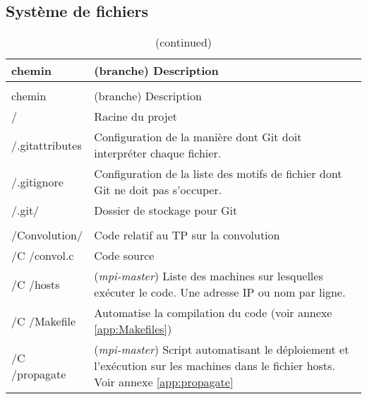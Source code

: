 \begin{onecolumn}

\section{Système de fichiers}

\begin{longtable}{>{\ttfamily}m{} p{}}
  \caption{Système de fichiers\label{fig:git:syst}}\\
  \null\hspace{0.15\textwidth}chemin & (branche) Description\\
  \hline
  \endfirsthead
  \caption{(continued)}\\
  \null\hspace{0.15\textwidth}chemin & (branche) Description\\
  \hline
  \endhead
    /                          & Racine du projet\\
    /.gitattributes            & Configuration de la manière dont Git
                                 doit interpréter chaque fichier.\\
    /.gitignore                & Configuration de la liste des motifs
                                 de fichier dont Git ne doit pas
                                 s'occuper.\\
    /.git/                     & Dossier de stockage pour Git\\
                               & \\
    /Convolution/              & Code relatif au TP sur la convolution\\
    /C /convol.c               & Code source\\
    /C /hosts                  & (\emph{mpi-master}) Liste des
                                 machines sur lesquelles exécuter le
                                 code. Une adresse IP ou nom par
                                 ligne.\\
    /C /Makefile               & Automatise la compilation du code
                                 (voir annexe \ref{app:Makefiles})\\
    /C /propagate              & (\emph{mpi-master}) Script
                                 automatisant le déploiement et
                                 l'exécution sur les machines dans le
                                 fichier hosts. Voir annexe
                                 \ref{app:propagate}\\

\end{longtable}
\end{onecolumn}
